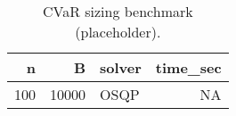 \begin{table}

\caption{\label{tab:unnamed-chunk-1}CVaR sizing benchmark (placeholder).}
\centering
\begin{tabular}[t]{rrlr}
\toprule
n & B & solver & time\_sec\\
\midrule
100 & 10000 & OSQP & NA\\
\bottomrule
\end{tabular}
\end{table}

